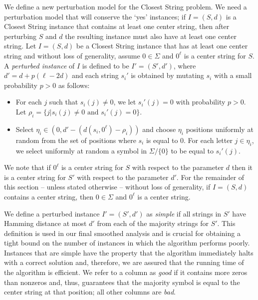 We define a new perturbation model for the {\sc Closest String} problem. We need a perturbation model that will conserve the `yes' instances; if $I = (S, d)$ is a {\sc Closest String} instance that contains at least one center string, then after perturbing $S$ and $d$ the resulting instance must also have at least one center string. Let $I = (S, d)$ be a {\sc Closest String} instance that has at least one center string and without loss of generality, assume $0 \in \Sigma$ and $0^{\ell}$ is a center string for $S$. A {\em perturbed instance}  of $I$ is defined to be  $I' = (S', d')$, where $d' = d  + p(\ell - 2d)$ and each string $s_i'$ is obtained by mutating $s_i$ with a small probability $p >0$ as follows: 

\begin{itemize}
\item For each $j$ such that $s_i(j) \ne 0$, we let $s_i'(j) = 0$ with probability $p > 0$. Let $\rho_i = \{j | s_i(j) \ne 0 \mbox{ and } s_i'(j) = 0\}$.
\item Select $\eta_i \in (0, d' - (d(s_i, 0^{\ell}) - \rho_i))$ and choose $\eta_i$ positions uniformly at random from the set of positions where $s_i$ is equal to 0. For each letter $j \in \eta_i$, we select uniformly at random a symbol in $\Sigma / \{0\}$ to be equal to $s_i'(j)$.
 \end{itemize}

\noindent We note that if $0^{\ell}$ is a center string for $S$ with respect to the parameter $d$ then it is a center string for $S'$ with respect to the parameter $d'$.  For the remainder of this section -- unless stated otherwise -- without loss of generality, if $I = (S, d)$ contains a center string, then $0 \in \Sigma$ and $0^{\ell}$ is a center string.  

We define a perturbed instance $I' = (S', d')$ as {\em simple} if all strings in $S'$ have Hamming distance at most $d'$ from each of the majority strings for $S'$.  This definition is used in our final smoothed analysis and is crucial for obtaining a tight bound on the number of instances in which the algorithm performs poorly. Instances that are simple have the property that the algorithm immediately halts with a correct solution and, therefore, we are assured that the running time of the algorithm is efficient.  We refer to a column as {\em good} if it contains more zeros than nonzeros and, thus, guarantees that the majority symbol is equal to the center string at that position; all other columns are {\em bad}.   

